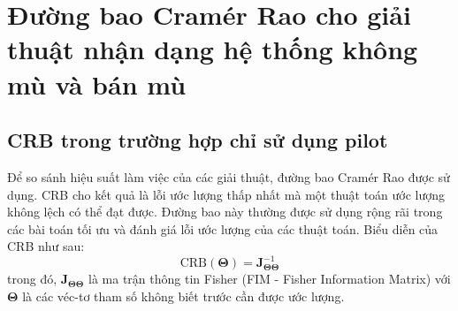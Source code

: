 \section{Đường bao Cramér Rao cho giải thuật nhận dạng hệ thống không mù và bán mù}\label{CRB}

\subsection{CRB trong trường hợp chỉ sử dụng pilot}

Để so sánh hiệu suất làm việc của các giải thuật, đường bao Cramér Rao được sử dụng. 
CRB cho kết quả là lỗi ước lượng thấp nhất mà một thuật toán ước lượng không lệch có thể đạt được. Đường bao này thường được sử dụng rộng rãi trong các bài toán tối ưu và đánh giá lỗi ước lượng của các thuật toán.
Biểu diễn của CRB như sau:
\begin{equation}
    \text{CRB}(\boldsymbol{\Theta}) = \mathbf{J}_{\boldsymbol{\Theta}\boldsymbol{\Theta}}^{-1}
\end{equation}
trong đó, $\mathbf{J}_{\boldsymbol{\Theta}\boldsymbol{\Theta}}$ là ma trận thông tin Fisher (FIM - Fisher Information Matrix) với $\boldsymbol{\Theta}$ là các véc-tơ tham số không biết trước cần được ước lượng.

